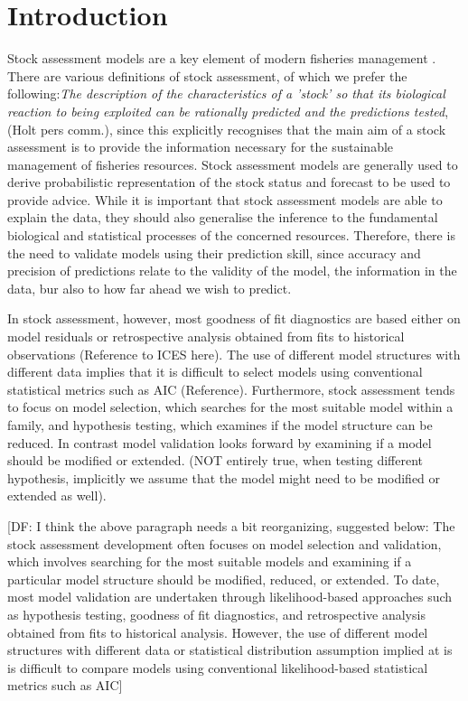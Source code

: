 \section{Introduction}
Stock assessment models are a key element of modern fisheries management \parencite{punt2020model}. There are various definitions of stock assessment, of which we prefer the following:\textit{The description of the characteristics of a 'stock' so that its biological reaction to being exploited can be rationally predicted and the predictions tested}, (Holt pers comm.), since this explicitly recognises that the main aim of a stock assessment is to provide the information necessary for the sustainable management of fisheries resources. Stock assessment models are generally used to derive probabilistic representation of the stock status and forecast to be used to provide advice. While it is important that stock assessment models are able to explain the data, they should also generalise the inference to the fundamental biological and statistical processes of the concerned resources. Therefore, there is the need to validate models using their prediction skill, since accuracy and precision of predictions relate to the validity of the model, the information in the data, bur also to how far ahead we wish to predict. 

In stock assessment, however, most goodness of fit diagnostics are based either on model residuals or retrospective analysis obtained from fits to historical observations (Reference to ICES here). The use of different model structures with different data implies that it is difficult to select models using conventional statistical metrics such as AIC (Reference).  Furthermore, stock assessment tends to focus on model selection, which searches for the most suitable model within a family, and hypothesis testing, which examines if the model structure can be reduced. In contrast model validation looks forward by examining if a model should be modified or extended. (NOT entirely true, when testing different hypothesis, implicitly we assume that the model might need to be modified or extended as well). 

[DF: I think the above paragraph needs a bit reorganizing, suggested below:
The stock assessment development often focuses on model selection and validation, which involves searching for the most suitable models and examining if a particular model structure should be modified, reduced, or extended. To date, most model validation are undertaken through likelihood-based approaches such as hypothesis testing, goodness of fit diagnostics, and retrospective analysis obtained from fits to historical analysis. However,  the use of different model structures with different data or statistical distribution assumption implied at is is difficult to compare models using conventional likelihood-based statistical metrics such as AIC]

